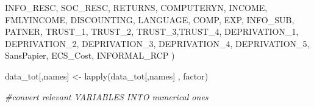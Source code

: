 \documentclass[
]{article}
\newenvironment{Shaded}{}{}
\newcommand{\CommentTok}[1]{\textcolor[rgb]{0.38,0.63,0.69}{\textit{#1}}}
\newcommand{\FunctionTok}[1]{\textcolor[rgb]{0.02,0.16,0.49}{#1}}
\newcommand{\NormalTok}[1]{#1}
\newcommand{\OtherTok}[1]{\textcolor[rgb]{0.00,0.44,0.13}{#1}}
\newcommand{\StringTok}[1]{\textcolor[rgb]{0.25,0.44,0.63}{#1}}
\begin{document}
\begin{Shaded}
\begin{Highlighting}[]
           \StringTok{\textquotesingle{}INFO\_RESC\textquotesingle{}}\NormalTok{, }\StringTok{\textquotesingle{}SOC\_RESC\textquotesingle{}}\NormalTok{, }\StringTok{\textquotesingle{}RETURNS\textquotesingle{}}\NormalTok{, }\StringTok{\textquotesingle{}COMPUTERYN\textquotesingle{}}\NormalTok{, }\StringTok{\textquotesingle{}INCOME\textquotesingle{}}\NormalTok{, }\StringTok{\textquotesingle{}FMLYINCOME\textquotesingle{}}\NormalTok{, }\StringTok{\textquotesingle{}DISCOUNTING\textquotesingle{}}\NormalTok{, }
           \StringTok{\textquotesingle{}LANGUAGE\textquotesingle{}}\NormalTok{, }\StringTok{\textquotesingle{}COMP\textquotesingle{}}\NormalTok{, }\StringTok{\textquotesingle{}EXP\textquotesingle{}}\NormalTok{, }\StringTok{\textquotesingle{}INFO\_SUB\textquotesingle{}}\NormalTok{, }\StringTok{\textquotesingle{}PATNER\textquotesingle{}}\NormalTok{, }
           \StringTok{\textquotesingle{}TRUST\_1\textquotesingle{}}\NormalTok{, }\StringTok{\textquotesingle{}TRUST\_2\textquotesingle{}}\NormalTok{, }\StringTok{\textquotesingle{}TRUST\_3\textquotesingle{}}\NormalTok{,}\StringTok{\textquotesingle{}TRUST\_4\textquotesingle{}}\NormalTok{, }
           \StringTok{\textquotesingle{}DEPRIVATION\_1\textquotesingle{}}\NormalTok{, }\StringTok{\textquotesingle{}DEPRIVATION\_2\textquotesingle{}}\NormalTok{, }\StringTok{\textquotesingle{}DEPRIVATION\_3\textquotesingle{}}\NormalTok{, }\StringTok{\textquotesingle{}DEPRIVATION\_4\textquotesingle{}}\NormalTok{, }\StringTok{\textquotesingle{}DEPRIVATION\_5\textquotesingle{}}\NormalTok{, }\StringTok{\textquotesingle{}SansPapier\textquotesingle{}}\NormalTok{, }\StringTok{\textquotesingle{}ECS\_Cost\textquotesingle{}}\NormalTok{, }\StringTok{\textquotesingle{}INFORMAL\_RCP\textquotesingle{}}
\NormalTok{)}

\NormalTok{data\_tot[,names] }\OtherTok{\textless{}{-}} \FunctionTok{lapply}\NormalTok{(data\_tot[,names] , factor)}

\CommentTok{\#convert relevant VARIABLES INTO numerical ones}


\end{Highlighting}
\end{Shaded}
\end{document}
